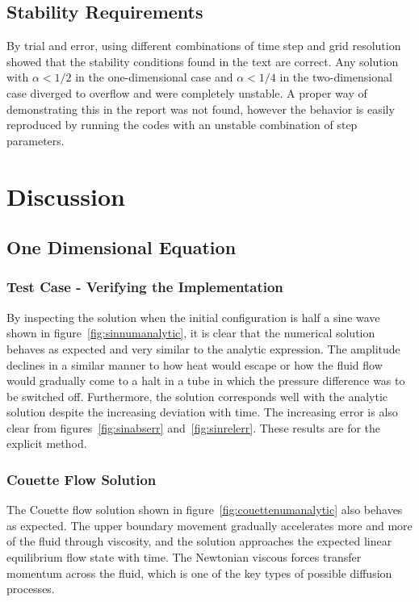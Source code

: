 \documentclass[aps,reprint]{revtex4-1}
\begin{document}
\subsection{Stability Requirements}
By trial and error, using different combinations of time step and grid resolution
showed that the stability conditions found in the text are correct. Any solution
with $\alpha < 1/2$ in the one-dimensional case and $\alpha < 1/4$ in the two-dimensional case
diverged to overflow and were completely unstable. A proper way of demonstrating
this in the report was not found, however the behavior is easily reproduced by
running the codes with an unstable combination of step parameters.
\section{Discussion} \label{sec:discussion}
\subsection{One Dimensional Equation}
\subsubsection{Test Case - Verifying the Implementation}
By inspecting the solution when the initial configuration is half a sine wave
shown in figure~\ref{fig:sinnumanalytic}, it is clear that the numerical solution
behaves as expected and very similar to the analytic expression. The amplitude
declines in a similar manner to how heat would escape or how the fluid flow would
gradually come to a halt in a tube in which the pressure difference was to be
switched off. Furthermore, the solution corresponds well with the analytic solution
despite the increasing deviation with time. The increasing error is also clear from
figures~\ref{fig:sinabserr} and~\ref{fig:sinrelerr}. These results are for the explicit method.
\subsubsection{Couette Flow Solution}
The Couette flow solution shown in figure~\ref{fig:couettenumanalytic} also behaves
as expected. The upper boundary movement gradually accelerates more and more of the fluid through
viscosity, and the solution approaches the expected linear equilibrium flow state
with time. The Newtonian viscous forces transfer momentum across the fluid, which
is one of the key types of possible diffusion processes.
\end{document}
